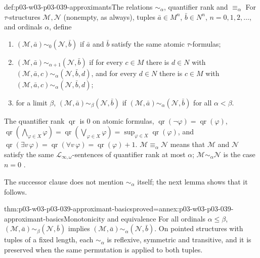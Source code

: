 \begin{hbdefinition}{def:p03-w03-p03-039-approximants}{The relations \(\sim_\alpha\), quantifier rank and \(\equiv_\alpha\)}
For \(\tau\)-structures \(\mathcal M,\mathcal N\) (nonempty, as always),
tuples \(\bar a\in M^n\), \(\bar b\in N^n\), \(n=0,1,2,\ldots\), and ordinals
\(\alpha\), define
\begin{enumerate}
\item \((\mathcal M,\bar a)\sim_0(\mathcal N,\bar b)\) if \(\bar a\) and
      \(\bar b\) satisfy the same atomic \(\tau\)-formulas;
\item \((\mathcal M,\bar a)\sim_{\alpha+1}(\mathcal N,\bar b)\) if for every
      \(c\in M\) there is \(d\in N\) with
      \((\mathcal M,\bar a,c)\sim_\alpha(\mathcal N,\bar b,d)\), and for every
      \(d\in N\) there is \(c\in M\) with
      \((\mathcal M,\bar a,c)\sim_\alpha(\mathcal N,\bar b,d)\);
\item for a limit \(\beta\), \((\mathcal M,\bar a)\sim_\beta(\mathcal N,\bar b)\)
      if \((\mathcal M,\bar a)\sim_\alpha(\mathcal N,\bar b)\) for all
      \(\alpha<\beta\).
\end{enumerate}
The quantifier rank \(\operatorname{qr}\) is \(0\) on atomic formulas,
\(\operatorname{qr}(\neg\varphi)=\operatorname{qr}(\varphi)\),
\(\operatorname{qr}(\bigwedge_{\varphi\in X}\varphi)=
\operatorname{qr}(\bigvee_{\varphi\in X}\varphi)=
\sup_{\varphi\in X}\operatorname{qr}(\varphi)\), and
\(\operatorname{qr}(\exists v\,\varphi)=\operatorname{qr}(\forall v\,\varphi)=
\operatorname{qr}(\varphi)+1\). \(\mathcal M\equiv_\alpha\mathcal N\) means
that \(\mathcal M\) and \(\mathcal N\) satisfy the same
\(\mathcal L_{\infty,\omega}\)-sentences of quantifier rank at most \(\alpha\);
\(\mathcal M\sim_\alpha\mathcal N\) is the case \(n=0\)
\cite[pp.~15--16, Defs.~2.9 and~2.10]{Marker2014InfinitaryNotes}.
\end{hbdefinition}

The successor clause does not mention \(\sim_\alpha\) itself; the next lemma
shows that it follows.

\begin{hblemma}{thm:p03-w03-p03-039-approximant-basics}{proved=annex:p03-w03-p03-039-approximant-basics}{Monotonicity and equivalence}
For all ordinals \(\alpha\le\beta\),
\((\mathcal M,\bar a)\sim_\beta(\mathcal N,\bar b)\) implies
\((\mathcal M,\bar a)\sim_\alpha(\mathcal N,\bar b)\). On pointed structures
with tuples of a fixed length, each \(\sim_\alpha\) is reflexive, symmetric
and transitive, and it is preserved when the same permutation is applied to
both tuples.
\end{hblemma}

